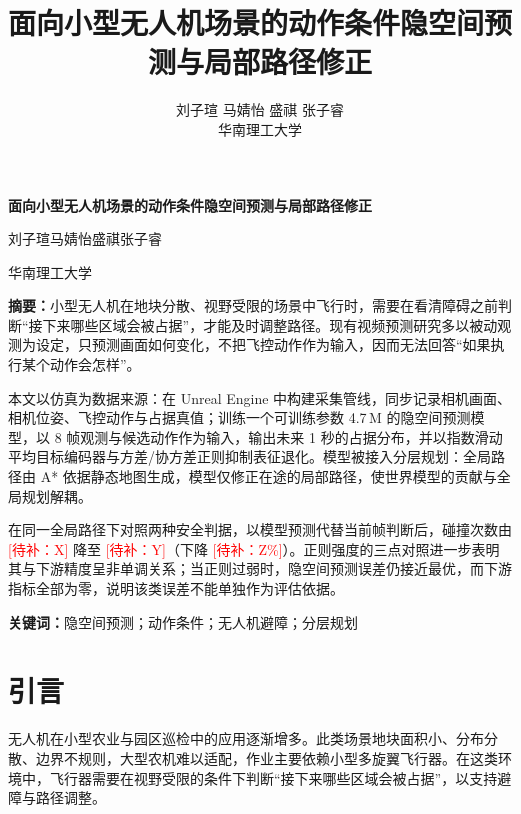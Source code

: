 \documentclass[12pt,a4paper]{ctexart}
\title{\textbf{面向小型无人机场景的动作条件隐空间预测与局部路径修正}}
\author{
  刘子瑄 \quad 马婧怡 \quad 盛祺 \quad 张子睿 \\[6pt]
  {\normalsize 华南理工大学}
}
\date{}
\newcommand{\todo}[1]{\textcolor{red}{[待补：#1]}}
\let\origcite\cite
\renewcommand{\cite}[2][]{\nobreak\mbox{\origcite[#1]{#2}}}
\begin{document}
\pagestyle{plain}
\thispagestyle{empty}

\begin{center}
  {\LARGE\bfseries 面向小型无人机场景的动作条件隐空间预测与局部路径修正\par}
  \vspace{16pt}
  {\large 刘子瑄\quad 马婧怡\quad 盛祺\quad 张子睿\par}
  \vspace{6pt}
  {\small\kaishu 华南理工大学\par}
\end{center}
\vspace{10pt}

\begingroup\small
\noindent\textbf{摘要：}小型无人机在地块分散、视野受限的场景中飞行时，需要在看清障碍之前判断``接下来哪些区域会被占据''，才能及时调整路径。现有视频预测研究多以被动观测为设定，只预测画面如何变化，不把飞控动作作为输入，因而无法回答``如果执行某个动作会怎样''。

本文以仿真为数据来源：在 Unreal Engine 中构建采集管线，同步记录相机画面、相机位姿、飞控动作与占据真值；训练一个可训练参数 4.7\,M 的隐空间预测模型\cite{assran2023ijepa,bardes2024vjepa}，以 8 帧观测与候选动作作为输入，输出未来 1 秒的占据分布，并以指数滑动平均目标编码器与方差/协方差正则抑制表征退化。模型被接入分层规划：全局路径由 A* 依据静态地图生成，模型仅修正在途的局部路径，使世界模型的贡献与全局规划解耦。

在同一全局路径下对照两种安全判据，以模型预测代替当前帧判断后，碰撞次数由 \todo{X} 降至 \todo{Y}（下降 \todo{Z\%}）。正则强度的三点对照进一步表明其与下游精度呈非单调关系；当正则过弱时，隐空间预测误差仍接近最优，而下游指标全部为零，说明该类误差不能单独作为评估依据。

\vspace{6pt}
\noindent\textbf{关键词：}隐空间预测；动作条件；无人机避障；分层规划
\endgroup

\vspace{16pt}


\section{引言}

无人机在小型农业与园区巡检中的应用逐渐增多。此类场景地块面积小、分布分散、边界不规则，大型农机难以适配，作业主要依赖小型多旋翼飞行器。在这类环境中，飞行器需要在视野受限的条件下判断``接下来哪些区域会被占据''，以支持避障与路径调整。
\end{document}
